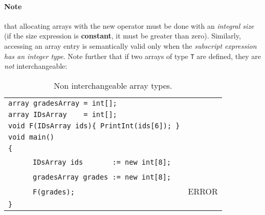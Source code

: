 \documentclass{article}
\begin{document}
\paragraph{Note} that allocating arrays with the new operator
must be done with an \textit{integral size} (if the size expression is \textbf{constant}, it must be greater than zero).
Similarly, accessing an array entry is semantically valid
only when the \textit{subscript expression has an integer type}.
Note further that if two arrays of type \verb"T" are defined,
they are \textit{not} interchangeable:
\begin{table}[h]
\centering
\begin{tabular}{ | l | l | }
\hline
\verb"array gradesArray = int[];"                 &       \\
\verb"array IDsArray    = int[];"                 &       \\
\verb"void F(IDsArray ids){ PrintInt(ids[6]); }" &       \\
\verb"void main()"                               &       \\
\verb"{"                                         &       \\
~ ~ ~ ~\verb"IDsArray ids       := new int[8];"  &       \\
~ ~ ~ ~\verb"gradesArray grades := new int[8];"  &       \\
~ ~ ~ ~\verb"F(grades);"                         & ERROR \\
\verb"}"                                         &       \\
\hline
\end{tabular}
\caption{Non interchangeable array types.
\label{Table_Code_Examples_nil_Instead_Of_Any_Array}}
\end{table}  
\end{document}
